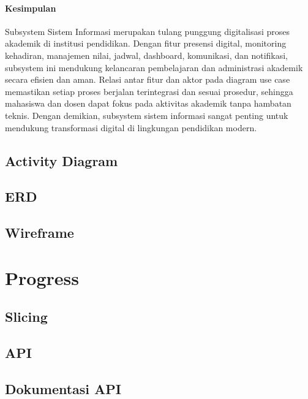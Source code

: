 \documentclass[a4paper,oneside,11pt]{book}
\begin{document}
\subsubsection{Kesimpulan}

Subsystem Sistem Informasi merupakan tulang punggung digitalisasi proses akademik di institusi pendidikan. Dengan fitur presensi digital, monitoring kehadiran, manajemen nilai, jadwal, dashboard, komunikasi, dan notifikasi, subsystem ini mendukung kelancaran pembelajaran dan administrasi akademik secara efisien dan aman. Relasi antar fitur dan aktor pada diagram use case memastikan setiap proses berjalan terintegrasi dan sesuai prosedur, sehingga mahasiswa dan dosen dapat fokus pada aktivitas akademik tanpa hambatan teknis. Dengan demikian, subsystem sistem informasi sangat penting untuk mendukung transformasi digital di lingkungan pendidikan modern.


\section{Activity Diagram}
\section{ERD}
\section{Wireframe}

\chapter{Progress}
\section{Slicing}
\section{API}
\section{Dokumentasi API}
\end{document}
